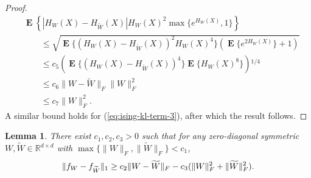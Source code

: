 \documentclass[letterpaper]{amsart}
\DeclarePairedDelimiter{\norm}{\lVert}{\rVert}
\newcommand{\R}{\mathbb{R}}
\DeclareMathOperator{\E}{\mathbf{E}}
\let\originalleft\left
\let\originalright\right
\def\left#1{\mathopen{}\originalleft#1}
\def\right#1{\originalright#1\mathclose{}}
\renewcommand{\eqref}[1]{(\ref{eq:#1})}
\numberwithin{thm}{section}
\newtheorem{lem}[thm]{Lemma}{\bfseries}{\itshape}
\newcommand{\lemlabel}[1]{\label{lem:#1}}
\theoremstyle{definition}
\theoremstyle{plain}
\renewcommand{\tilde}[1]{\widetilde{#1}}
\begin{document}
\begin{proof}
  \begin{align*}
    &\E\left\{ |H_W(X) - H_{\tilde{W}}(X)| H_W(X)^2 \max\{e^{H_W(X)}, 1\}\right\} \\
 &\qquad \le \sqrt{ \E\{ (H_W(X) - H_{\tilde{W}}(X))^2 H_W(X)^4\} (\E\{e^{2 H_W(X)}\} + 1) } \\
 &\qquad \le c_5 \left(\E\{(H_W(X) - H_{\tilde{W}}(X))^4\} \E\{H_W(X)^8\}\right)^{1/4} \\
 &\qquad \le c_6 \|W - \tilde{W}\|_F \|W\|_F^2 \\
 &\qquad \le c_7 \|W\|_F^2 .
  \end{align*}
  A similar bound holds for \eqref{ising-kl-term-3}, after which the result follows.
\end{proof}

\begin{lem}\lemlabel{ising-l1}
  There exist $c_1, c_2, c_3 > 0$ such that for any zero-diagonal
  symmetric $W, \tilde{W} \in \R^{d \times d}$ with
  $\max\{\|W\|_F, \|\tilde{W}\|_F\} < c_1$,
  \[
    \norm{f_W - f_{\tilde{W}}}_1 \ge c_2 \|W - \tilde{W}\|_F - c_3(\|W\|_F^2 + \|\tilde{W}\|_F^2).
  \]
\end{lem}
\end{document}
